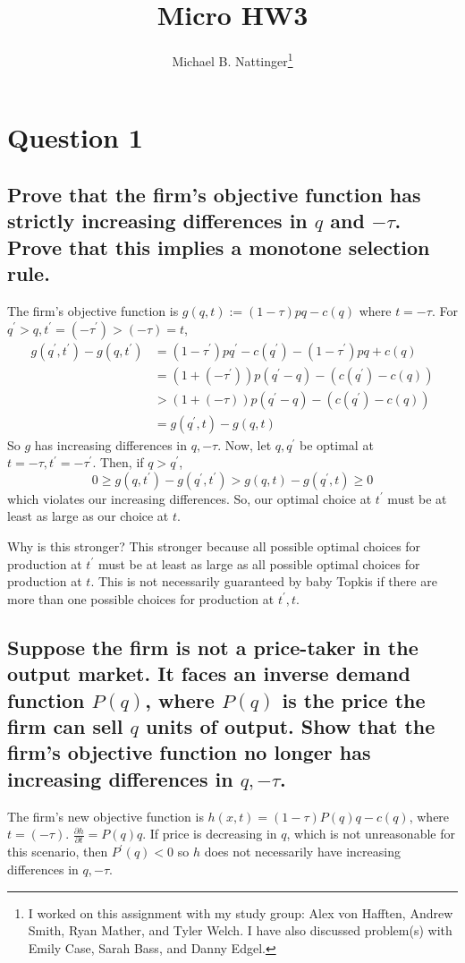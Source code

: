 \documentclass[11pt]{article} %
\title{Micro HW3}
\author{Michael B. Nattinger\footnote{I worked on this assignment with my study group: Alex von Hafften, Andrew Smith, Ryan Mather, and Tyler Welch. I have also discussed problem(s) with Emily Case, Sarah Bass, and Danny Edgel.}}
\begin{document}
\maketitle

\section{Question 1}
\subsection{Prove that the firm's objective function has strictly increasing differences in $q$ and $-\tau$. Prove that this implies a monotone selection rule.}
The firm's objective function is $g(q,t):= (1-\tau)pq - c(q)$ where $t = -\tau$. For $q^{'}>q,t^{'} = (-\tau^{'})>(-\tau) = t$,
\begin{align*}
g(q^{'},t^{'}) - g(q,t^{'}) &=  (1-\tau^{'})pq^{'} - c(q^{'}) - (1-\tau^{'})pq + c(q)\\
&=   (1+(-\tau^{'}))p(q^{'} - q) - (c(q^{'}) -c(q))\\
&> (1+(-\tau))p(q^{'} - q) - (c(q^{'}) -c(q))\\
&= g(q^{'},t) - g(q,t)
\end{align*}
So $g$ has increasing differences in $q,-\tau$. Now, let $q,q^{'}$ be optimal at $t = -\tau,t^{'} = -\tau^{'}$. Then, if $q>q^{'}$,
\begin{equation*}
0 \geq g(q,t^{'}) - g(q^{'},t^{'})> g(q,t) - g(q^{'},t) \geq 0
\end{equation*}
which violates our increasing differences. So, our optimal choice at $t^{'}$ must be at least as large as our choice at $t$.

Why is this stronger? This stronger because all possible optimal choices for production at $t^{'}$ must be at least as large as all possible optimal choices for production at $t$.  This is not necessarily guaranteed by baby Topkis if there are more than one possible choices for production at $t^{'},t$.
\subsection{Suppose the firm is not a price-taker in the output market. It faces an inverse demand function $P(q)$, where $P(q)$ is the price the firm can sell $q$ units of output. Show that the firm's objective function no longer has increasing differences in $q,-\tau$.}
The firm's new objective function is $h(x,t) = (1-\tau)P(q)q - c(q)$, where $t=(-\tau)$. $\frac{\partial h}{\partial t} = P(q)q$. If price is decreasing in $q$, which is not unreasonable for this scenario, then $P^{'}(q)<0$ so $h$ does not necessarily have increasing differences in $q,-\tau$.
\end{document}
